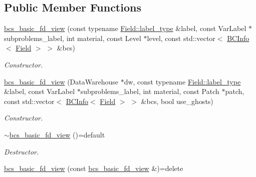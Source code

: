\subsection*{Public Member Functions}
\begin{DoxyCompactItemize}
\item 
\hyperlink{classUintah_1_1PhaseField_1_1detail_1_1bcs__basic__fd__view_3_01ScalarField_3_01T_01_4_00_01STN_07caa9955adf783da0505eac75e76f08_a1b5f0227833fd0dc7da0ec1c45d97eb8}{bcs\+\_\+basic\+\_\+fd\+\_\+view} (const typename \hyperlink{structUintah_1_1PhaseField_1_1ScalarField_a7a77875e030da64c47ce9f6c22a06959}{Field\+::label\+\_\+type} \&label, const Var\+Label $\ast$subproblems\+\_\+label, int material, const Level $\ast$level, const std\+::vector$<$ \hyperlink{structUintah_1_1PhaseField_1_1BCInfo}{B\+C\+Info}$<$ \hyperlink{structUintah_1_1PhaseField_1_1ScalarField}{Field} $>$ $>$ \&bcs)
\begin{DoxyCompactList}\small\item\em Constructor. \end{DoxyCompactList}\item 
\hyperlink{classUintah_1_1PhaseField_1_1detail_1_1bcs__basic__fd__view_3_01ScalarField_3_01T_01_4_00_01STN_07caa9955adf783da0505eac75e76f08_ac3029d7ee0cdc524ddba34e999a7cb18}{bcs\+\_\+basic\+\_\+fd\+\_\+view} (Data\+Warehouse $\ast$dw, const typename \hyperlink{structUintah_1_1PhaseField_1_1ScalarField_a7a77875e030da64c47ce9f6c22a06959}{Field\+::label\+\_\+type} \&label, const Var\+Label $\ast$subproblems\+\_\+label, int material, const Patch $\ast$patch, const std\+::vector$<$ \hyperlink{structUintah_1_1PhaseField_1_1BCInfo}{B\+C\+Info}$<$ \hyperlink{structUintah_1_1PhaseField_1_1ScalarField}{Field} $>$ $>$ \&bcs, bool use\+\_\+ghosts)
\begin{DoxyCompactList}\small\item\em Constructor. \end{DoxyCompactList}\item 
\hyperlink{classUintah_1_1PhaseField_1_1detail_1_1bcs__basic__fd__view_3_01ScalarField_3_01T_01_4_00_01STN_07caa9955adf783da0505eac75e76f08_ae66035ebabe57b04d0436bc17ee82c82}{$\sim$bcs\+\_\+basic\+\_\+fd\+\_\+view} ()=default
\begin{DoxyCompactList}\small\item\em Destructor. \end{DoxyCompactList}\item 
\hyperlink{classUintah_1_1PhaseField_1_1detail_1_1bcs__basic__fd__view_3_01ScalarField_3_01T_01_4_00_01STN_07caa9955adf783da0505eac75e76f08_a383094a6f77183df1e6799934780adce}{bcs\+\_\+basic\+\_\+fd\+\_\+view} (const \hyperlink{classUintah_1_1PhaseField_1_1detail_1_1bcs__basic__fd__view}{bcs\+\_\+basic\+\_\+fd\+\_\+view} \&)=delete

\end{DoxyCompactItemize}
